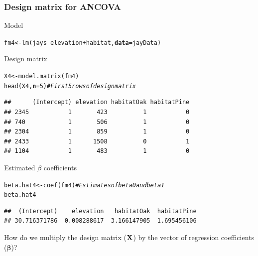 \documentclass[color=usenames,dvipsnames]{beamer}\usepackage[]{graphicx}\usepackage[]{color}
\makeatletter
\newcommand{\hlnum}[1]{\textcolor[rgb]{0.69,0.494,0}{#1}}%
\newcommand{\hlcom}[1]{\textcolor[rgb]{0.514,0.506,0.514}{\textit{#1}}}%
\newcommand{\hlopt}[1]{\textcolor[rgb]{0,0,0}{#1}}%
\newcommand{\hlstd}[1]{\textcolor[rgb]{0,0,0}{#1}}%
\newcommand{\hlkwb}[1]{\textcolor[rgb]{0,0.341,0.682}{#1}}%
\newcommand{\hlkwc}[1]{\textcolor[rgb]{0,0,0}{\textbf{#1}}}%
\newcommand{\hlkwd}[1]{\textcolor[rgb]{0.004,0.004,0.506}{#1}}%
\newenvironment{kframe}{%
 \def\at@end@of@kframe{}%
 \ifinner\ifhmode%
  \def\at@end@of@kframe{\end{minipage}}%
  \begin{minipage}{\columnwidth}%
 \fi\fi%
 \def\FrameCommand##1{\hskip\@totalleftmargin \hskip-\fboxsep
 \colorbox{shadecolor}{##1}\hskip-\fboxsep
     \hskip-\linewidth \hskip-\@totalleftmargin \hskip\columnwidth}%
 \MakeFramed {\advance\hsize-\width
   \@totalleftmargin\z@ \linewidth\hsize
   \@setminipage}}%
 {\par\unskip\endMakeFramed%
 \at@end@of@kframe}
\newenvironment{knitrout}{}{} %
\makeatother
\begin{document}
\begin{frame}[fragile]
  \frametitle{Design matrix for ANCOVA}
  \scriptsize %
    {Model}
\begin{knitrout}\scriptsize
{}\color{fgcolor}\begin{kframe}
\begin{alltt}
\hlstd{fm4} \hlkwb{<-} \hlkwd{lm}\hlstd{(jays} \hlopt{~} \hlstd{elevation} \hlopt{+} \hlstd{habitat,} \hlkwc{data}\hlstd{=jayData)}
\end{alltt}
\end{kframe}
\end{knitrout}
\pause
\vfill
{Design matrix}

\begin{knitrout}\scriptsize
{}\color{fgcolor}\begin{kframe}
\begin{alltt}
\hlstd{X4} \hlkwb{<-} \hlkwd{model.matrix}\hlstd{(fm4)}
\hlkwd{head}\hlstd{(X4,} \hlkwc{n}\hlstd{=}\hlnum{5}\hlstd{)} \hlcom{# First 5 rows of design matrix}
\end{alltt}
\begin{verbatim}
##      (Intercept) elevation habitatOak habitatPine
## 2345           1       423          1           0
## 740            1       506          1           0
## 2304           1       859          1           0
## 2433           1      1508          0           1
## 1104           1       483          1           0
\end{verbatim}
\end{kframe}
\end{knitrout}

{Estimated $\beta$ coefficients}
\begin{knitrout}\scriptsize
{}\color{fgcolor}\begin{kframe}
\begin{alltt}
\hlstd{beta.hat4} \hlkwb{<-} \hlkwd{coef}\hlstd{(fm4)} \hlcom{# Estimates of beta0 and beta1}
\hlstd{beta.hat4}
\end{alltt}
\begin{verbatim}
##  (Intercept)    elevation   habitatOak  habitatPine 
## 30.716371786  0.008288617  3.166147905  1.695456106
\end{verbatim}
\end{kframe}
\end{knitrout}
\pause
\vfill
{\centering How do we multiply the design matrix ($\bf X$) by
 the vector of regression coefficients ($\bm \beta$)? \\}
\end{frame}
\end{document}
